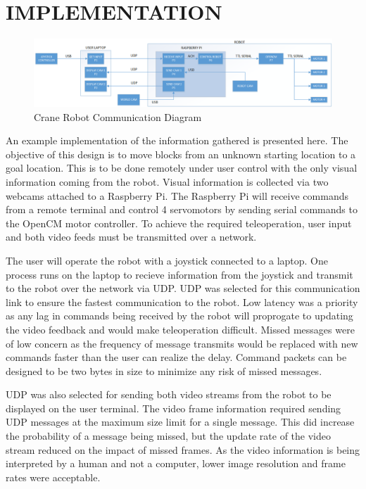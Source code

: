 \section{IMPLEMENTATION}
\begin{figure}[thpb]
 \centering
 \includegraphics[width=2.0\columnwidth]{./images/cranebot2.png}
  \caption{Crane Robot Communication Diagram}
  \label{fig:cranebot block}
\end{figure} 

An example implementation of the information gathered is presented here. The objective of this design is to move blocks from an unknown starting location to a goal location. This is to be done remotely under user control with the only visual information coming from the robot. Visual information is collected via two webcams attached to a Raspberry Pi. The Raspberry Pi will receive commands from a remote terminal and control 4 servomotors by sending serial commands to the OpenCM motor controller. To achieve the required teleoperation, user input and both video feeds must be transmitted over a network.

The user will operate the robot with a joystick connected to a laptop. One process runs on the laptop to recieve information from the joystick and transmit to the robot over the network via UDP. UDP was selected for this communication link to ensure the fastest communication to the robot. Low latency was a priority as any lag in commands being received by the robot will proprogate to updating the video feedback and would make teleoperation difficult. Missed messages were of low concern as the frequency of message transmits would be replaced with new commands faster than the user can realize the delay. Command packets can be designed to be two bytes in size to minimize any risk of missed messages.

UDP was also selected for sending both video streams from the robot to be displayed on the user terminal. The video frame information required sending UDP messages at the maximum size limit for a single message. This did increase the probability of a message being missed, but the update rate of the video stream reduced on the impact of missed frames. As the video information is being interpreted by a human and not a computer, lower image resolution and frame rates were acceptable.

